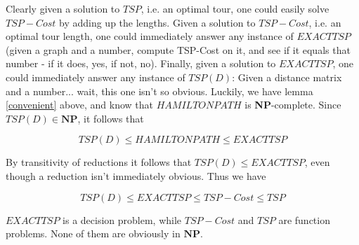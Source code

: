 Clearly given a solution to $TSP$, i.e. an optimal tour, one could easily solve $TSP-Cost$ by adding up the lengths. Given a solution to $TSP-Cost$, i.e. an optimal tour length, one could immediately answer any instance of $EXACT TSP$ (given a graph and a number, compute TSP-Cost on it, and see if it equals that number - if it does, yes, if not, no). Finally, given a solution to $EXACT TSP$, one could immediately answer any instance of $TSP(D)$: Given a distance matrix and a number... wait, this one isn't so obvious. Luckily, we have lemma \ref{convenient} above, and know that $HAMILTON PATH$ is \textbf{NP}-complete. Since $TSP(D) \in \mathbf{NP}$, it follows that 

\[ TSP(D) \leq HAMILTON PATH \leq EXACT TSP \]

By transitivity of reductions it follows that $TSP(D) \leq EXACT TSP$, even though a reduction isn't immediately obvious. Thus we have

\[ TSP(D) \leq EXACT TSP \leq TSP-Cost \leq TSP \]

$EXACT TSP$ is a decision problem, while $TSP-Cost$ and $TSP$ are function problems. None of them are obviously in $\mathbf{NP}$. 



